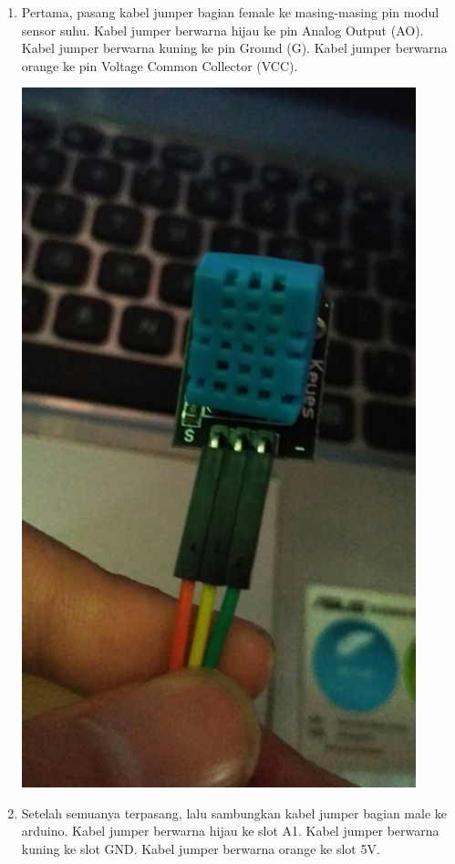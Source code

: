 \documentclass{article}
\begin{document}
\begin{enumerate}
	
	\item  Pertama, pasang kabel jumper bagian female ke masing-masing pin modul sensor suhu. Kabel jumper berwarna hijau ke pin Analog Output (AO). Kabel jumper berwarna kuning ke pin Ground (G). Kabel jumper berwarna orange ke pin Voltage Common Collector (VCC).
	\break
	\centerline{\includegraphics[width=0.9\textwidth]{figures/female.jpg}}
	\break
	\item Setelah semuanya terpasang, lalu sambungkan kabel jumper bagian male ke arduino. Kabel jumper berwarna hijau ke slot A1. Kabel jumper berwarna kuning ke slot GND. Kabel jumper berwarna orange ke slot 5V.

\end{enumerate}
\end{document}
